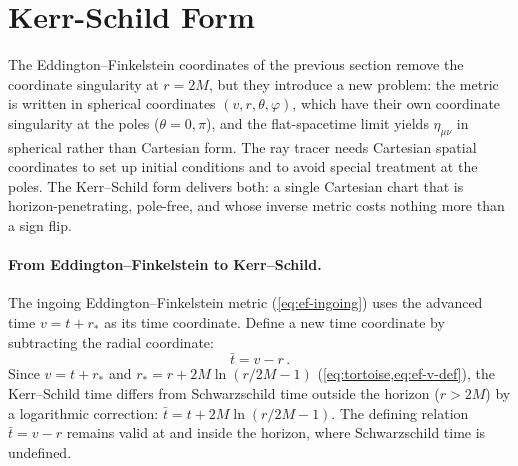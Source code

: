 \section{Kerr-Schild Form}
\label{sec:schw-kerr-schild}

The Eddington--Finkelstein coordinates of the previous section remove the
coordinate singularity at $r = 2M$, but they introduce a new problem: the
metric is written in spherical coordinates $(v, r, \theta, \varphi)$, which
have their own coordinate singularity at the poles ($\theta = 0, \pi$), and
the flat-spacetime limit yields $\eta_{\mu\nu}$ in spherical rather than
Cartesian form.  The ray tracer needs Cartesian spatial coordinates to set
up initial conditions and to avoid special treatment at the poles.  The
Kerr--Schild form delivers both: a single Cartesian chart that is
horizon-penetrating, pole-free, and whose inverse metric costs nothing more
than a sign flip.

\paragraph{From Eddington--Finkelstein to Kerr--Schild.}

The ingoing Eddington--Finkelstein metric (\cref{eq:ef-ingoing}) uses the
advanced time $v = t + r_*$ as its time coordinate.  Define a new time
coordinate by subtracting the radial coordinate:
%
\begin{equation}
  \bar{t} = v - r \,.
  \label{eq:ks-time-def}
\end{equation}
%
Since $v = t + r_*$ and $r_* = r + 2M\ln(r/2M - 1)$
(\cref{eq:tortoise,eq:ef-v-def}), the Kerr--Schild time differs from
Schwarzschild time outside the horizon ($r > 2M$) by a logarithmic
correction: $\bar{t} = t + 2M\ln(r/2M - 1)$.  The defining relation
$\bar{t} = v - r$ remains valid at and inside the horizon, where
Schwarzschild time is undefined.

